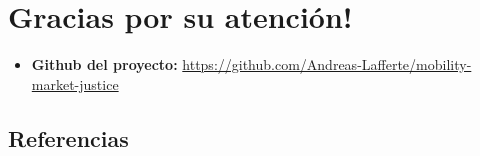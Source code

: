 \documentclass[
  spanish,
  letterpaper,
  DIV=11,
  numbers=noendperiod,
  oneside]{scrartcl}
\providecommand{\tightlist}{%
  \setlength{\itemsep}{0pt}\setlength{\parskip}{0pt}}
\begin{document}
\section{Gracias por su atención!}\label{gracias-por-su-atenciuxf3n}

\begin{itemize}
\tightlist
\item
  \textbf{Github del proyecto:}
  \url{https://github.com/Andreas-Lafferte/mobility-market-justice}
\end{itemize}

\subsection*{Referencias}\label{referencias}
\end{document}
